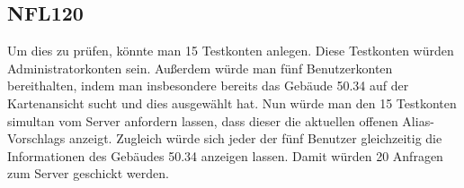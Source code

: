 \subsection*{NFL120}
Um dies zu prüfen, könnte man 15 Testkonten anlegen. Diese Testkonten würden \Gls{Administrator}konten sein. Außerdem würde man fünf \Gls{Benutzer}konten bereithalten, indem man insbesondere bereits das Gebäude 50.34 auf der \Gls{Kartenansicht} sucht und dies ausgewählt hat. Nun würde man den 15 Testkonten \gls{simultan} vom \Gls{Server} anfordern lassen, dass dieser die aktuellen offenen \Glspl{Alias-Vorschlag} anzeigt. Zugleich würde sich jeder der fünf \Gls{Benutzer} gleichzeitig die Informationen des Gebäudes 50.34 anzeigen lassen. Damit würden 20 Anfragen zum \Gls{Server} geschickt werden.